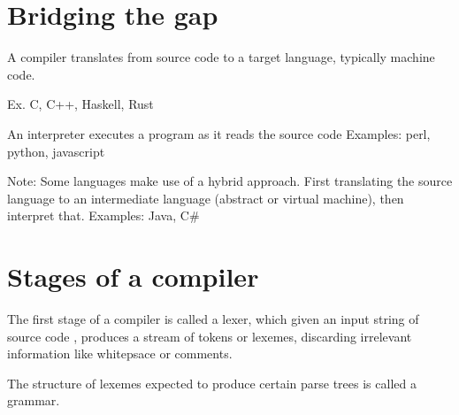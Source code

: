 \section{Bridging the gap}

\begin{definition}
  A compiler translates from source code to a target language,
  typically machine code. 
\end{definition}
Ex. C, C++, Haskell, Rust

\begin{definition}
 An interpreter executes a program as it reads the source code 
 Examples: perl, python, javascript
\end{definition}

Note: Some languages make use of a hybrid approach. First translating
the source language to an intermediate language (abstract or virtual machine),
then interpret that. 
Examples: Java, C#

\section{Stages of a compiler}

\begin{itemize*}
The first stage of a compiler is called a lexer, which given an input string of source
code , produces a stream of tokens or lexemes, discarding irrelevant information
like whitepsace or comments.
\end{itemize*}

\begin{definition}
  The structure of lexemes expected to produce certain parse trees is called a grammar.
\end{definition}


